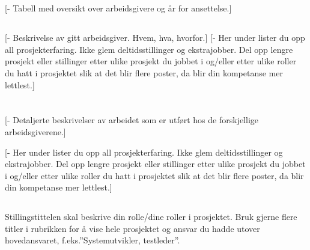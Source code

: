 \documentclass[11pt,a4paper,sans]{moderncv}
\begin{document}

\section{}
[- Tabell med oversikt over arbeidsgivere og år for ansettelse.]

\subsection{}
[- Beskrivelse av gitt arbeidsgiver. Hvem, hva, hvorfor.]
[- Her under lister du opp all prosjekterfaring. Ikke glem deltidsstillinger og
ekstrajobber. 
Del opp lengre prosjekt eller stillinger etter ulike prosjekt du jobbet  i
og/eller etter ulike roller du hatt i prosjektet slik at det blir flere poster,
da blir din kompetanse mer lettlest.]

\section{}
[- Detaljerte beskrivelser av arbeidet som er utført hos de forskjellige
arbeidsgiverene.]

[- Her under lister du opp all prosjekterfaring. Ikke glem deltidsstillinger og
ekstrajobber. 
Del opp lengre prosjekt eller stillinger etter ulike prosjekt du jobbet  i
og/eller etter ulike roller du hatt i prosjektet slik at det blir flere poster,
da blir din kompetanse mer lettlest.]

\subsection{}
Stillingstittelen skal beskrive din rolle/dine roller i prosjektet. Bruk gjerne
flere titler i rubrikken for å vise hele prosjektet og ansvar du hadde utover
hovedansvaret, f.eks.”Systemutvikler, testleder”.
\end{document}

